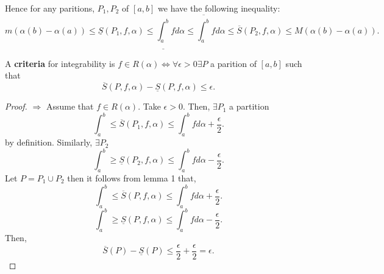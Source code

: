 \documentclass[a4paper]{article}
\newcommand{\upRint}[2]{
  \overline{\int_{#1}^{#2}}
}
\newcommand{\loRint}[2]{
  \underline{\int_{#1}^{#2}}
}
\begin{document}
\noindent\hrulefill 

Hence for any paritions, $P_1, P_2$ of $[a,b]$ we have the following inequality:
 \[
   m(\alpha (b) - \alpha (a)) \leq \underline{S} (P_1, f, \alpha) \leq \loRint{a}{b} f d \alpha \leq \upRint{a}{b} f d \alpha \leq \overline{S} (P_2, f, \alpha) \leq M(\alpha (b) - \alpha(a))
.\] 

\noindent\hrulefill

\begin{prop}
  A \textbf{criteria} for integrability is $f \in R(\alpha) \iff \forall \epsilon > 0 \exists P$ a parition of $[a,b] $ such that
   \[
     \overline{S} (P,f, \alpha) - \underline{S} (P, f, \alpha) \leq \epsilon 
  .\] 

  \noindent\hrulefill

  \begin{proof}
    $\Rightarrow$ Assume that  $f \in R(\alpha)$. Take  $\epsilon > 0$. Then, $\exists P_1$ a partition
    \[
    \int_{a}^{b} \leq \overline{S} (P_1, f, \alpha) \leq \int_{a}^{b} f d \alpha + \frac{\epsilon}{2}   
    .\] by definition.
    Similarly, $\exists P_2$
    \[
     \int_{a}^{b} \geq \underline{S} (P_2, f, \alpha) \leq \int_{a}^{b} f d \alpha - \frac{\epsilon}{2}   
    .\] 
    Let $P = P_1 \cup P_2$ then it follows from lemma 1 that, 
 \[
    \int_{a}^{b} \leq \overline{S} (P, f, \alpha) \leq \int_{a}^{b} f d \alpha + \frac{\epsilon}{2}   
    .\]
    \[
     \int_{a}^{b} \geq \underline{S} (P, f, \alpha) \leq \int_{a}^{b} f d \alpha - \frac{\epsilon}{2}   
    .\]
    Then,
    \[
      \overline{S}(P) - \underline{S} (P) \leq \frac{\epsilon}{2} + \frac{\epsilon}{2} = \epsilon
    .\] 
  \end{proof}
\end{prop}
\end{document}
